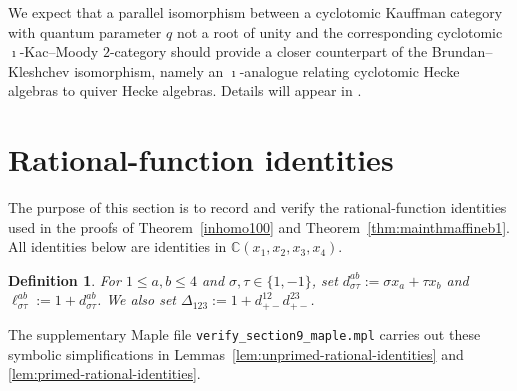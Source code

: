 \documentclass[a4,10pt]{amsart}
\numberwithin{equation}{section}
\newtheorem{Defn}[Theorem]{Definition}
\theoremstyle{definition}
\begin{document}
We expect that a parallel isomorphism between  a cyclotomic Kauffman category with quantum parameter $q$ not a  root of unity and the corresponding cyclotomic $\imath$-Kac--Moody $2$-category should  provide a closer counterpart of the Brundan--Kleshchev isomorphism, namely an $\imath$-analogue relating cyclotomic Hecke algebras to quiver Hecke algebras. Details will appear in \cite{GHRS}.







\section{Rational-function identities}
The purpose of this section is to record and verify the
rational-function identities used in the proofs of
Theorem~\ref{inhomo100} and Theorem~\ref{thm:mainthmaffineb1}. All identities below are identities 
in  $\mathbb C(x_1,x_2,x_3,x_4)$.

\begin{Defn}For $1\leq a,b\leq4$ and $\sigma,\tau\in\{1,-1\}$, set
\(
 d^{ab}_{\sigma\tau}:=\sigma x_a+\tau x_b\) and 
 \(
 \ell^{ab}_{\sigma\tau}:=1+d^{ab}_{\sigma\tau}\).
We also set
$
\Delta_{123}:=1+d^{12}_{+-}d^{23}_{+-}$.\end{Defn}
The supplementary
Maple file \texttt{verify\_section9\_maple.mpl} carries out these
symbolic simplifications in Lemmas~\ref{lem:unprimed-rational-identities} and \ref{lem:primed-rational-identities}.
\end{document}

